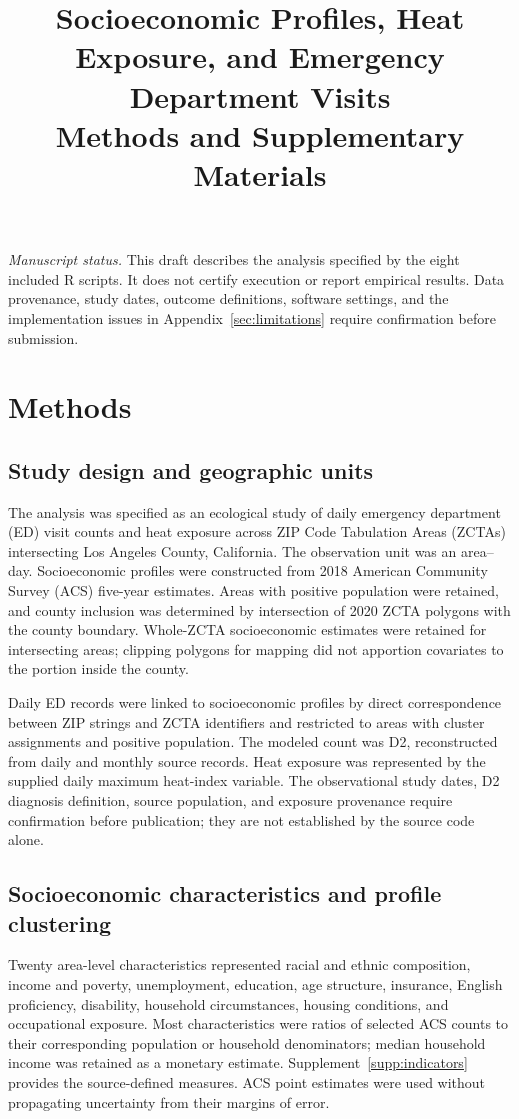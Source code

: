 \documentclass[11pt,letterpaper]{article}
\title{Socioeconomic Profiles, Heat Exposure, and Emergency Department Visits\\\large Methods and Supplementary Materials}
\author{}
\date{}
\begin{document}
\maketitle
\textit{Manuscript status.} This draft describes the analysis specified by the eight included R scripts. It does not certify execution or report empirical results. Data provenance, study dates, outcome definitions, software settings, and the implementation issues in Appendix~\ref{sec:limitations} require confirmation before submission.

\section{Methods}
\label{sec:methods}

\subsection{Study design and geographic units}
The analysis was specified as an ecological study of daily emergency department (ED) visit counts and heat exposure across ZIP Code Tabulation Areas (ZCTAs) intersecting Los Angeles County, California. The observation unit was an area--day. Socioeconomic profiles were constructed from 2018 American Community Survey (ACS) five-year estimates. Areas with positive population were retained, and county inclusion was determined by intersection of 2020 ZCTA polygons with the county boundary. Whole-ZCTA socioeconomic estimates were retained for intersecting areas; clipping polygons for mapping did not apportion covariates to the portion inside the county.

Daily ED records were linked to socioeconomic profiles by direct correspondence between ZIP strings and ZCTA identifiers and restricted to areas with cluster assignments and positive population. The modeled count was D2, reconstructed from daily and monthly source records. Heat exposure was represented by the supplied daily maximum heat-index variable. The observational study dates, D2 diagnosis definition, source population, and exposure provenance require confirmation before publication; they are not established by the source code alone.

\subsection{Socioeconomic characteristics and profile clustering}
Twenty area-level characteristics represented racial and ethnic composition, income and poverty, unemployment, education, age structure, insurance, English proficiency, disability, household circumstances, housing conditions, and occupational exposure. Most characteristics were ratios of selected ACS counts to their corresponding population or household denominators; median household income was retained as a monetary estimate. Supplement~\ref{supp:indicators} provides the source-defined measures. ACS point estimates were used without propagating uncertainty from their margins of error.
\end{document}
